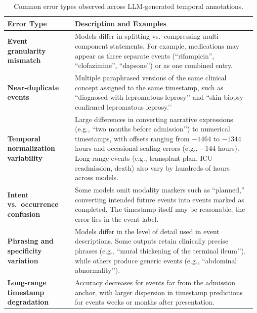 \begin{table}[htbp]
\caption{Common error types observed across LLM-generated temporal annotations.}
\ChFiveTableBodyStart
\begin{ChFiveFloatBody}

\centering


\begin{tabular}{>{\raggedright\arraybackslash}p{3.2cm} >{\raggedright\arraybackslash}p{9cm}}
\toprule
\textbf{Error Type} & \textbf{Description and Examples} \\
\midrule

\textbf{Event granularity mismatch} 
& Models differ in splitting vs.\ compressing multi-component statements. 
For example, medications may appear as three separate events (``rifampicin'', ``clofazimine'', ``dapsone'') or as one combined entry. \\[6pt]

\textbf{Near-duplicate events} 
& Multiple paraphrased versions of the same clinical concept assigned to the same timestamp, such as 
``diagnosed with lepromatous leprosy’’ and 
``skin biopsy confirmed lepromatous leprosy.’’ \\[6pt]

\textbf{Temporal normalization variability} 
& Large differences in converting narrative expressions (e.g., ``two months before admission’’) to numerical timestamps, with offsets ranging from $-1464$ to $-1344$ hours and occasional scaling errors (e.g., $-144$ hours). Long-range events (e.g., transplant plan, ICU readmission, death) also vary by hundreds of hours across models. \\[6pt]

\textbf{Intent vs.\ occurrence confusion} 
& Some models omit modality markers such as ``planned,'' converting intended future events into events marked as completed. 
The timestamp itself may be reasonable; the error lies in the event label. \\[6pt]

\textbf{Phrasing and specificity variation} 
& Models differ in the level of detail used in event descriptions.  
Some outputs retain clinically precise phrases (e.g., ``mural thickening of the terminal ileum’’), while others produce generic events (e.g., ``abdominal abnormality’’). \\[6pt]

\textbf{Long-range timestamp degradation} 
& Accuracy decreases for events far from the admission anchor, with larger dispersion in timestamp predictions for events weeks or months after presentation. \\
\bottomrule
\end{tabular}


\end{ChFiveFloatBody}
\end{table}